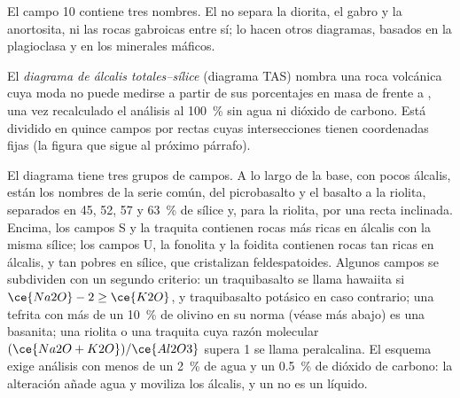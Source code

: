 \begin{omfigure}
\par{}
\end{omfigure}

El campo 10 contiene tres nombres. El  no separa la diorita, el gabro y la
anortosita, ni las rocas gabroicas entre sí; lo hacen otros diagramas, basados en la
plagioclasa y en los minerales máficos.

\begin{definition}\label{def:b2:magmatic-series:tas}
El \emph{diagrama de álcalis totales--sílice} (diagrama
TAS) nombra una roca volcánica cuya moda no puede medirse a partir de sus porcentajes
en masa de  frente a , una vez recalculado el análisis
al \qty{100}{\percent} sin agua ni dióxido de carbono. Está dividido
en quince campos por rectas cuyas intersecciones tienen coordenadas fijas
(la figura que sigue al próximo párrafo).
\end{definition}

El diagrama tiene tres grupos de campos. A lo largo de la base, con pocos álcalis, están los
nombres de la serie común, del picrobasalto y el basalto a la riolita, separados en 45, 52,
57 y \qty{63}{\percent} de sílice y, para la riolita, por una recta inclinada. Encima, los campos S y la traquita contienen rocas más ricas en
álcalis con la misma sílice; los campos U, la fonolita y la foidita contienen rocas tan ricas en
álcalis, y tan pobres en sílice, que cristalizan feldespatoides. Algunos campos se
subdividen con un segundo criterio: un traquibasalto se llama hawaiita si $\ce{Na2O} - 2
\ge \ce{K2O}$, y traquibasalto potásico en caso contrario; una tefrita con más de un
\qty{10}{\percent} de olivino en su norma (véase más abajo) es una basanita; una riolita o una traquita cuya
razón molecular $(\ce{Na2O + K2O})/\ce{Al2O3}$ supera 1 se llama peralcalina. El esquema
exige análisis con menos de un \qty{2}{\percent} de agua y un \qty{0.5}{\percent} de
dióxido de carbono: la alteración añade agua y moviliza los álcalis, y un  no es un
líquido.

